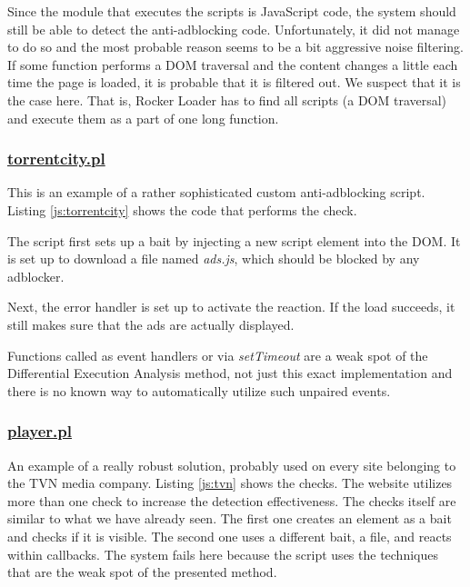 Since the module that executes the scripts is JavaScript code, the system should still be able
to detect the anti-adblocking code. Unfortunately, it did not manage to do so 
and the most probable reason seems to be a bit aggressive noise filtering. 
If some function performs a DOM traversal and
the content changes a little each time the page is loaded, it is probable that it is filtered out.
We suspect that it is the case here. That is, Rocker Loader has to find all scripts (a DOM traversal) and execute them
as a part of one long function.

\subsubsection{\url{torrentcity.pl}}
This is an example of a rather sophisticated custom anti-adblocking script.
Listing \ref{js:torrentcity} shows the code that performs the check.


                       
The script first sets up a bait by injecting a new script element into the DOM. It is set up to download
a file named \emph{ads.js}, which should be blocked by any adblocker.

Next, the error handler is set up to activate the reaction. If the load succeeds, it still
makes sure that the ads are actually displayed.

Functions called as event handlers or via \emph{setTimeout} are a weak spot of 
the Differential Execution Analysis method, not just this exact implementation 
and there is no known way to automatically utilize such unpaired events.

\subsubsection{\url{player.pl}}
An example of a really robust solution, probably used on every site belonging to the TVN media company.
Listing \ref{js:tvn} shows the checks. The website utilizes more than one check
to increase the detection effectiveness.
The checks itself are similar to what we have already seen. The first one creates an element as a bait 
and checks if it is visible. The second one uses a different bait, a file, and reacts within callbacks.
The system fails here because the script uses the techniques 
that are the weak spot of the presented method.

